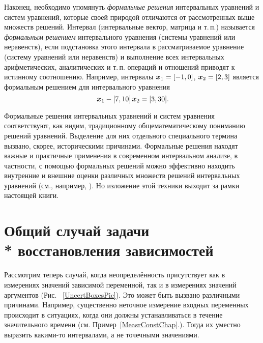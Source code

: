 \documentclass[a5paper,openany]{book}
\newcommand{\mbf}[1]{\protect\text{\boldmath$#1$}}
\newcounter{BazhenovExmp}
\begin{document}
Наконец, необходимо упомянуть \emph{формальные решения} интервальных уравнений 
и систем уравнений, которые своей природой отличаются 
от рассмотренных выше множеств решений.  Интервал (интервальные вектор, матрица 
и т.\,п.) называется \textit{формальным решением} интервального уравнения (системы 
уравнений или неравенств), если подстановка этого интервала в рассматриваемое 
уравнение (систему уравнений или неравенств) и выполнение всех интервальных 
арифметических, аналитических и т.\,п. операций и отношений приводят к истинному 
соотношению. Например, интервалы $\mbf{x}_{1} = [-1,0]$, $\mbf{x}_{2} = [2, 3]$ 
является формальным решением для интервального уравнения   \label{FormalSols} 
\begin{equation*} 
[10, 11]\,\mbf{x}_{1} - [7, 10]\,\mbf{x}_{2} = [3, 30]. 
\end{equation*} 
  
Формальные решения интервальных уравнений и систем уравнения соответствуют, как видим, 
традиционному общематематическому пониманию решений уравнений. Выделение для них 
отдельного специального термина вызвано, скорее, историческими причинами. Формальные 
решения находят важные и практичные применения в современном интервальном анализе, 
в частности, с помощью формальных решений можно эффективно находить внутренние и 
внешние оценки различных множеств решений интервальных уравнений (см., например, 
\cite{SSharyIzvAN97, SSharyBook}). Но изложение этой техники выходит за рамки 
настоящей книги. 
  
  
   
\section[Общий случай задачи восстановления зависимостей]%
        {Общий случай задачи \\* восстановления зависимостей} 
\label{GenIDataFitSect} 
  
  
Рассмотрим теперь случай, когда неопределённость присутствует как в измерениях 
значений зависимой переменной, так и в измерениях значений аргументов 
(Рис.~ \ref{UncertBoxesPic}). Это может быть вызвано различными причинами. 
Например, существенно неточное измерение входных переменных происходит 
в ситуациях, когда они должны устанавливаться в течение значительного времени 
(см. Пример~\ref{MeasrConstChap}.). Тогда их уместно выразить 
какими-то интервалами, а не точечными значениями. 
  
\end{document}
